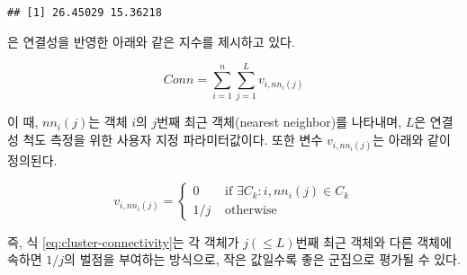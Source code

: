 \documentclass[]{book}
\begin{document}
\begin{verbatim}
## [1] 26.45029 15.36218
\end{verbatim}

\citet{handl2005exploiting} 은 연결성을 반영한 아래와 같은 지수를 제시하고 있다.

\begin{equation}
Conn = \sum_{i = 1}^{n} \sum_{j = 1}^{L} v_{i, nn_{i}(j)} \label{eq:cluster-connectivity}
\end{equation}

이 때, \(nn_{i}(j)\)는 객체 \(i\)의 \(j\)번째 최근 객체(nearest neighbor)를 나타내며, \(L\)은 연결성 척도 측정을 위한 사용자 지정 파라미터값이다. 또한 변수 \(v_{i, nn_i(j)}\)는 아래와 같이 정의된다.

\begin{equation*}
v_{i, nn_i(j)} = \begin{cases}
0 & \text{ if } \exists C_k : i, nn_i(j) \in C_k \\
1 / j & \text{ otherwise} 
\end{cases}
\end{equation*}

즉, 식 \eqref{eq:cluster-connectivity}는 각 객체가 \(j (\leq L)\)번째 최근 객체와 다른 객체에 속하면 \(1 / j\)의 벌점을 부여하는 방식으로, 작은 값일수록 좋은 군집으로 평가될 수 있다.
\end{document}
